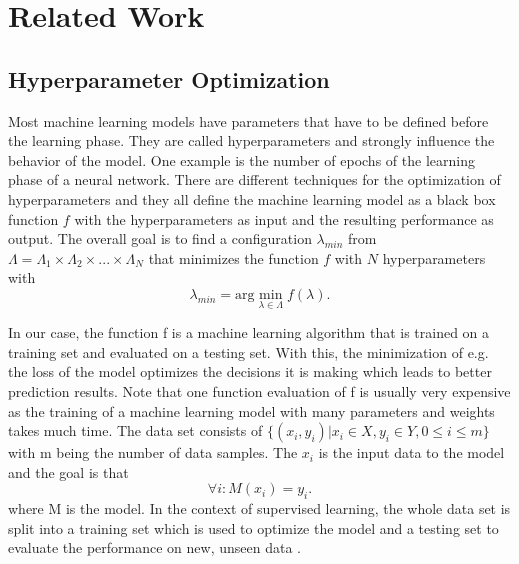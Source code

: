 
\chapter{Related Work}\label{chapter:theoretical_background}

\section{Hyperparameter Optimization}

Most machine learning models have parameters that have to be defined before the learning phase. They are called hyperparameters and strongly influence the behavior of the model. One example is the number of epochs of the learning phase of a neural network. There are different techniques for the optimization of hyperparameters and they all define the machine learning model as a black box function $ f $ with the hyperparameters as input and the resulting performance as output. The overall goal is to find a configuration $ \lambda_{min} $ from $ \Lambda = \Lambda_1 \times \Lambda_2 \times ... \times \Lambda_N $ that minimizes the function $ f $ with $ N $ hyperparameters with 
\begin{equation}
	\label{eq:optimization}
	\lambda_{min} = \text{arg} \min_{\lambda \in \Lambda} f(\lambda) .
\end{equation}

In our case, the function f is a machine learning algorithm that is trained on a training set and evaluated on a testing set. With this, the minimization of e.g. the loss of the model optimizes the decisions it is making which leads to better prediction results. Note that one function evaluation of f is usually very expensive as the training of a machine learning model with many parameters and weights takes much time. The data set consists of $ \{ (x_i, y_i) | x_i \in X, y_i \in Y, 0 \le i \le m \} $ with m being the number of data samples. The $ x_i $ is the input data to the model and the goal is that 
\begin{equation}
	\forall i: M(x_i) = y_i.
\end{equation}
where M is the model. In the context of supervised learning, the whole data set is split into a training set which is used to optimize the model and a testing set to evaluate the performance on new, unseen data \cite{supervised_learning}.

